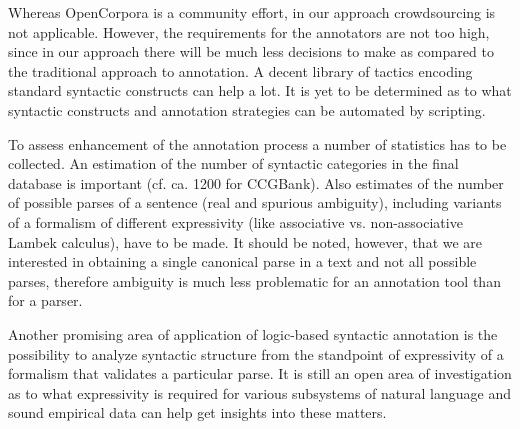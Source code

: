\documentclass[a4paper]{article}
\theoremstyle{example-style}
\begin{document}
Whereas OpenCorpora is a community effort, in our approach crowdsourcing is not applicable. However, the requirements for the annotators are not too high, since in our approach there will be much less decisions to make as compared to the traditional approach to annotation. A decent library of tactics encoding standard syntactic constructs can help a lot. It is yet to be determined as to what syntactic constructs and annotation strategies can be automated by scripting.

To assess enhancement of the annotation process a number of statistics has to be collected. An estimation of the number of syntactic categories in the final database is important (cf. ca. 1200 for CCGBank). Also estimates of the number of possible parses of a sentence (real and spurious ambiguity), including variants of a formalism of different expressivity (like associative vs. non-associative Lambek calculus), have to be made. It should be noted, however, that we are interested in obtaining a single canonical parse in a text and not all possible parses, therefore ambiguity is much less problematic for an annotation tool than for a parser.
  
Another promising area of application of logic-based syntactic annotation is the possibility to analyze syntactic structure from the standpoint of expressivity of a formalism that validates a particular parse. It is still an open area of investigation as to what expressivity is required for various subsystems of natural language and sound empirical data can help get insights into these matters.



\printbibliography[resetnumbers=true]
\end{document}
